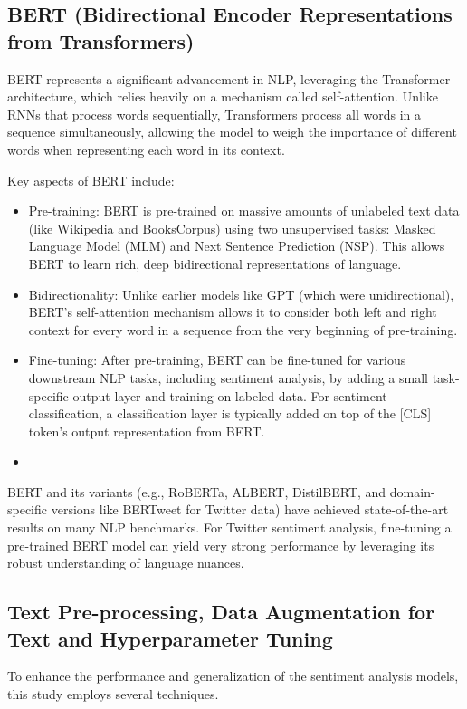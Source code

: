 \subsection{BERT (Bidirectional Encoder Representations from Transformers)}
BERT represents a significant advancement in NLP, leveraging the Transformer architecture, which relies heavily on a mechanism called self-attention. Unlike RNNs that process words sequentially, Transformers process all words in a sequence simultaneously, allowing the model to weigh the importance of different words when representing each word in its context.

Key aspects of BERT include:

\begin{itemize}
    \item Pre-training: BERT is pre-trained on massive amounts of unlabeled text data (like Wikipedia and BooksCorpus) using two unsupervised tasks: Masked Language Model (MLM) and Next Sentence Prediction (NSP). This allows BERT to learn rich, deep bidirectional representations of language.
    \item Bidirectionality: Unlike earlier models like GPT (which were unidirectional), BERT's self-attention mechanism allows it to consider both left and right context for every word in a sequence from the very beginning of pre-training.
    \item Fine-tuning: After pre-training, BERT can be fine-tuned for various downstream NLP tasks, including sentiment analysis, by adding a small task-specific output layer and training on labeled data. For sentiment classification, a classification layer is typically added on top of the [CLS] token's output representation from BERT.
    \item 
\end{itemize}
BERT and its variants (e.g., RoBERTa, ALBERT, DistilBERT, and domain-specific versions like BERTweet for Twitter data) have achieved state-of-the-art results on many NLP benchmarks. For Twitter sentiment analysis, fine-tuning a pre-trained BERT model can yield very strong performance by leveraging its robust understanding of language nuances.

\subsection{Text Pre-processing, Data Augmentation for Text and Hyperparameter Tuning}

To enhance the performance and generalization of the sentiment analysis models, this study employs several techniques.

